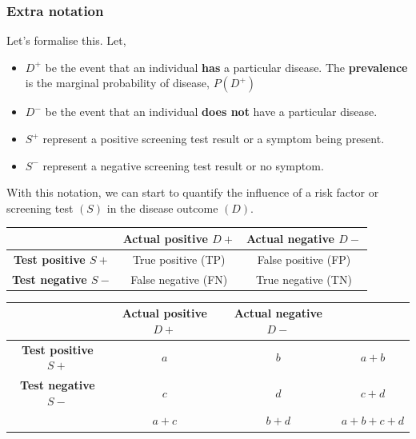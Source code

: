 \documentclass[a4paper]{article}
\begin{document}
\subsubsection{Extra notation}
Let's formalise this. Let,
\begin{itemize}
	\item \textcolor{mygreen}{\( D^+ \)} be the event that an individual \textbf{has} a particular disease. The \textbf{prevalence} is the marginal probability of disease, \( P(D^+) \)
	\item \textcolor{mygreen}{\( D^- \)} be the event that an individual \textbf{does not} have a particular disease.
	\item \textcolor{myred}{\( S^+ \)} represent a positive screening test result or a symptom being present.
	\item \textcolor{myred}{\( S^- \)} represent a negative screening test result or no symptom.
\end{itemize}
With this notation, we can start to quantify the influence of a risk factor or screening test \( (S) \) in the disease outcome \( (D) \).
\begin{table}[H]
	\centering
	\begin{tabular}{@{}c|cc@{}}
	\toprule
	                                & \textcolor{mygreen}{\textbf{Actual positive \( D+ \)}} & \textcolor{mygreen}{\textbf{Actual negative \( D- \)}} \\ \midrule
	\textcolor{myred}{\textbf{Test positive \( S+ \)}}  & True positive (TP)       & False positive (FP)      \\
	\textcolor{myred}{\textbf{Test negative \( S- \)}} & False negative (FN)      & True negative (TN)       \\ \bottomrule
	\end{tabular}
\end{table}
\begin{table}[H]
	\centering
	\begin{tabular}{@{}cccc@{}}
	\toprule
	& \textcolor{mygreen}{\textbf{Actual positive \( D+ \)}} & \textcolor{mygreen}{\textbf{Actual negative \( D- \)}} \\ \midrule
	\textcolor{myred}{\textbf{Test positive \( S+ \)}}  & \( a \)   & \( b \)   & \( a + b \) \\
	\textcolor{myred}{\textbf{Test negative \( S- \)}} & \( c \)   & \( d \)   & \( c + d \) \\
													   & \( a+c \) & \( b+d \) & \( a + b + c + d \) \\ \bottomrule
	\end{tabular}
\end{table}
\end{document}
